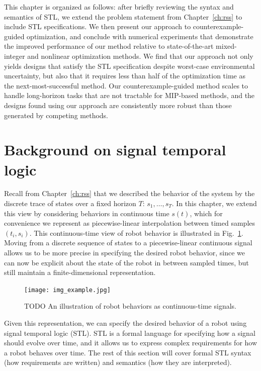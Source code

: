 This chapter is organized as follows: after briefly reviewing the syntax and semantics of STL, we extend the problem statement from Chapter~\ref{ch:rss} to include STL specifications. We then present our approach to counterexample-guided optimization, and conclude with numerical experiments that demonstrate the improved performance of our method relative to state-of-the-art mixed-integer and nonlinear optimization methods. We find that our approach not only yields designs that satisfy the STL specification despite worst-case environmental uncertainty, but also that it requires less than half of the optimization time as the next-most-successful method. Our counterexample-guided method scales to handle long-horizon tasks that are not tractable for MIP-based methods, and the designs found using our approach are consistently more robust than those generated by competing methods.

\section{Background on signal temporal logic}

Recall from Chapter~\ref{ch:rss} that we described the behavior of the system by the discrete trace of states over a fixed horizon $T$: $s_1, \ldots, s_T$. In this chapter, we extend this view by considering behaviors in continuous time $s(t)$, which for convenience we represent as piecewise-linear interpolation between timed samples $(t_i, s_i)$. This continuous-time view of robot behavior is illustrated in Fig.~\ref{ch:iros:fig:timed_signal}. Moving from a discrete sequence of states to a piecewise-linear continuous signal allows us to be more precise in specifying the desired robot behavior, since we can now be explicit about the state of the robot in between sampled times, but still maintain a finite-dimensional representation.

\begin{figure}[t]
    \centering
    \texttt{[image: img\_example.jpg]}
    \caption{TODO An illustration of robot behaviors as continuous-time signals.}
    \label{ch:iros:fig:timed_signal}
\end{figure}

Given this representation, we can specify the desired behavior of a robot using signal temporal logic (STL). STL is a formal language for specifying how a signal should evolve over time, and it allows us to express complex requirements for how a robot behaves over time. The rest of this section will cover formal STL syntax (how requirements are written) and semantics (how they are interpreted).

